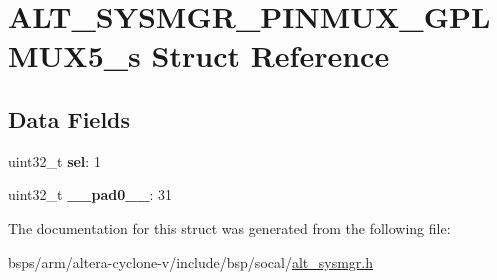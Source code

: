 \hypertarget{structALT__SYSMGR__PINMUX__GPLMUX5__s}{}\section{A\+L\+T\+\_\+\+S\+Y\+S\+M\+G\+R\+\_\+\+P\+I\+N\+M\+U\+X\+\_\+\+G\+P\+L\+M\+U\+X5\+\_\+s Struct Reference}
\label{structALT__SYSMGR__PINMUX__GPLMUX5__s}
\subsection*{Data Fields}
\begin{DoxyCompactItemize}
\item 
\mbox{\label{structALT__SYSMGR__PINMUX__GPLMUX5__s_ae711fe950dd9c979d6ed2579252ca1d7}} 
uint32\+\_\+t {\bfseries sel}\+: 1
\item 
\mbox{\label{structALT__SYSMGR__PINMUX__GPLMUX5__s_a2ba02c973565a1aea9ce42ed00009d7a}} 
uint32\+\_\+t {\bfseries \+\_\+\+\_\+pad0\+\_\+\+\_\+}\+: 31
\end{DoxyCompactItemize}


The documentation for this struct was generated from the following file\+:\begin{DoxyCompactItemize}
\item 
bsps/arm/altera-\/cyclone-\/v/include/bsp/socal/\mbox{\hyperlink{alt__sysmgr_8h}{alt\+\_\+sysmgr.\+h}}\end{DoxyCompactItemize}
